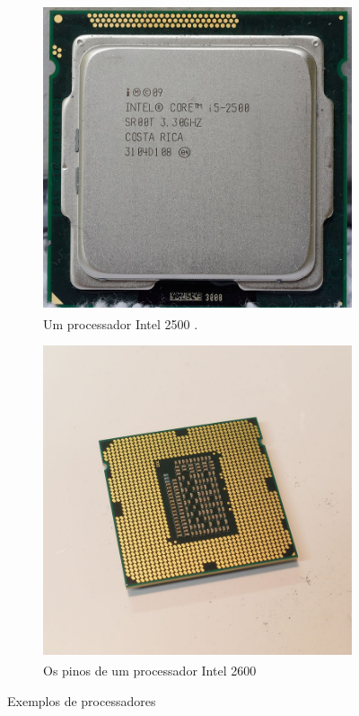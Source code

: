 \begin{figure}[H]
    \centering
    \begin{subfigure}{.5\textwidth}
        \centering
        \includegraphics[width=.7\linewidth]{chapters/chp3/images/intel-i5-2500-processor.jpg}
        \caption{Um processador Intel\textsuperscript{\textregistered} 2500 \cite{wiki:i5_2500}.}
        \label{subfig:processor-example-1}
    \end{subfigure}
    \begin{subfigure}{.5\textwidth}
        \centering
        \includegraphics[width=.7\linewidth]{chapters/chp3/images/intel-i7-2600k-processor-pins.jpg}
        \caption{Os pinos de um processador Intel\textsuperscript{\textregistered} 2600 \cite{wiki:i7_2600}}
        \label{subfig:processor-example-2}
    \end{subfigure}
    \caption{Exemplos de processadores}
    \label{fig:processors}
\end{figure}